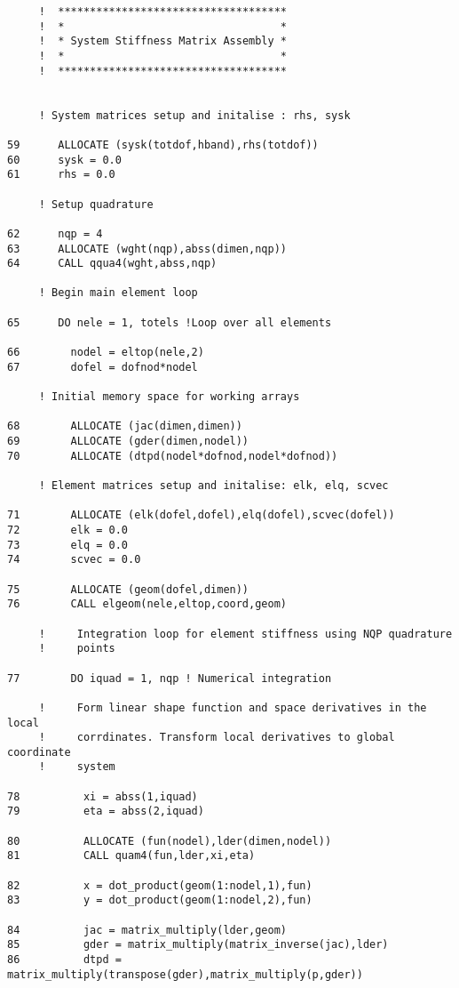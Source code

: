 \begin{verbatim}
     !  ************************************
     !  *                                  *
     !  * System Stiffness Matrix Assembly *
     !  *                                  *
     !  ************************************
     
     
     ! System matrices setup and initalise : rhs, sysk
     
59      ALLOCATE (sysk(totdof,hband),rhs(totdof))
60      sysk = 0.0
61      rhs = 0.0
     
     ! Setup quadrature
     
62      nqp = 4
63      ALLOCATE (wght(nqp),abss(dimen,nqp))
64      CALL qqua4(wght,abss,nqp)
     
     ! Begin main element loop
     
65      DO nele = 1, totels !Loop over all elements
     
66        nodel = eltop(nele,2)
67        dofel = dofnod*nodel
     
     ! Initial memory space for working arrays
     
68        ALLOCATE (jac(dimen,dimen))
69        ALLOCATE (gder(dimen,nodel))
70        ALLOCATE (dtpd(nodel*dofnod,nodel*dofnod))
     
     ! Element matrices setup and initalise: elk, elq, scvec
     
71        ALLOCATE (elk(dofel,dofel),elq(dofel),scvec(dofel))
72        elk = 0.0
73        elq = 0.0
74        scvec = 0.0
     
75        ALLOCATE (geom(dofel,dimen))
76        CALL elgeom(nele,eltop,coord,geom)
     
     !     Integration loop for element stiffness using NQP quadrature
     !     points
     
77        DO iquad = 1, nqp ! Numerical integration
     
     !     Form linear shape function and space derivatives in the local
     !     corrdinates. Transform local derivatives to global coordinate
     !     system
     
78          xi = abss(1,iquad)
79          eta = abss(2,iquad)
     
80          ALLOCATE (fun(nodel),lder(dimen,nodel))
81          CALL quam4(fun,lder,xi,eta)
     
82          x = dot_product(geom(1:nodel,1),fun)
83          y = dot_product(geom(1:nodel,2),fun)
     
84          jac = matrix_multiply(lder,geom)
85          gder = matrix_multiply(matrix_inverse(jac),lder)
86          dtpd = matrix_multiply(transpose(gder),matrix_multiply(p,gder))
     

\end{verbatim}
